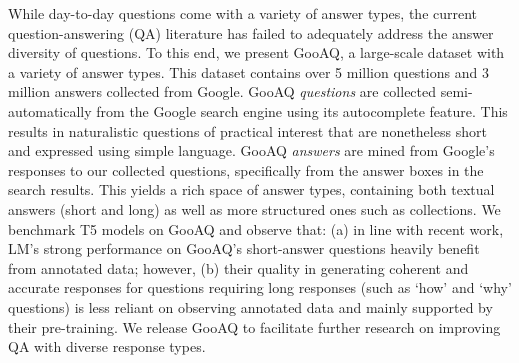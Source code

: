 While day-to-day questions come with a variety of answer types, the current question-answering (QA) literature has failed to adequately address the answer diversity of questions. To this end, we present GooAQ, a large-scale dataset with a variety of answer types.  This dataset contains over 5 million questions and 3 million answers collected from Google. GooAQ \emph{questions} are collected semi-automatically from the Google search engine using its autocomplete feature. This results in naturalistic questions of practical interest that are nonetheless short and expressed using simple language. GooAQ \emph{answers} are mined from Google's responses to our collected questions, specifically from the answer boxes in the search results.  This yields a rich space of answer types, containing both textual answers (short and long) as well as more structured ones such as collections. We benchmark T5 models on GooAQ and observe that: (a) in line with recent work, LM's strong performance on GooAQ's short-answer questions heavily benefit from annotated data; however, (b) their quality in generating coherent and accurate responses for questions requiring long responses (such as `how' and `why' questions) is less reliant on observing annotated data and mainly supported by their pre-training. We release GooAQ to facilitate further research on improving QA with diverse response types.

